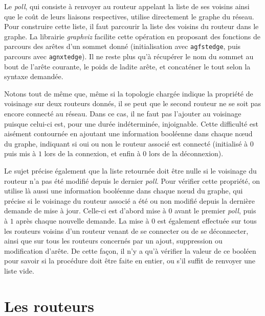 \documentclass[a4paper,11pt]{article}
\begin{document}
Le \textit{poll}, qui consiste à renvoyer au routeur appelant la liste de ses voisins ainsi que le coût de leurs liaisons respectives, utilise directement le graphe du réseau. Pour construire cette liste, il faut parcourir la liste des voisins du routeur dans le graphe. La librairie \textit{graphviz} facilite cette opération en proposant des fonctions de parcours des arêtes d'un sommet donné (initialisation avec \texttt{agfstedge}, puis parcours avec \texttt{agnxtedge}). Il ne reste plus qu'à récupérer le nom du sommet au bout de l'arête courante, le poids de ladite arête, et concaténer le tout selon la syntaxe demandée.

Notons tout de même que, même si la topologie chargée indique la propriété de voisinage sur deux routeurs donnés, il se peut que le second routeur ne se soit pas encore connecté au réseau. Dans ce cas, il ne faut pas l'ajouter au voisinage puisque celui-ci est, pour une durée indéterminée, injoignable. Cette difficulté est aisément contournée en ajoutant une information booléenne dans chaque n\oe ud du graphe, indiquant si oui ou non le routeur associé est connecté (initialisé à $0$ puis mis à $1$ lors de la connexion, et enfin à $0$ lors de la déconnexion).

Le sujet précise également que la liste retournée doit être nulle si le voisinage du routeur n'a pas été modifié depuis le dernier \textit{poll}. Pour vérifier cette propriété, on utilise là aussi une information booléenne dans chaque n\oe ud du graphe, qui précise si le voisinage du routeur associé a été ou non modifié depuis la dernière demande de mise à jour. Celle-ci est d'abord mise à $0$ avant le premier \textit{poll}, puis à $1$ après chaque nouvelle demande. La mise à $0$ est également effectuée sur tous les routeurs voisins d'un routeur venant de se connecter ou de se déconnecter, ainsi que sur tous les routeurs concernés par un ajout, suppression ou modification d'arête. De cette façon, il n'y a qu'à vérifier la valeur de ce booléen pour savoir si la procédure doit être faite en entier, ou s'il suffit de renvoyer une liste vide.

\section{Les routeurs}
\end{document}
